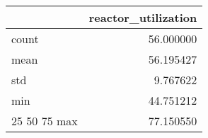 \begin{tabular}{lr}
\toprule
 & reactor\_utilization \\
\midrule
count & 56.000000 \\
mean & 56.195427 \\
std & 9.767622 \\
min & 44.751212 \\
25%
50%
75%
max & 77.150550 \\
\bottomrule
\end{tabular}

